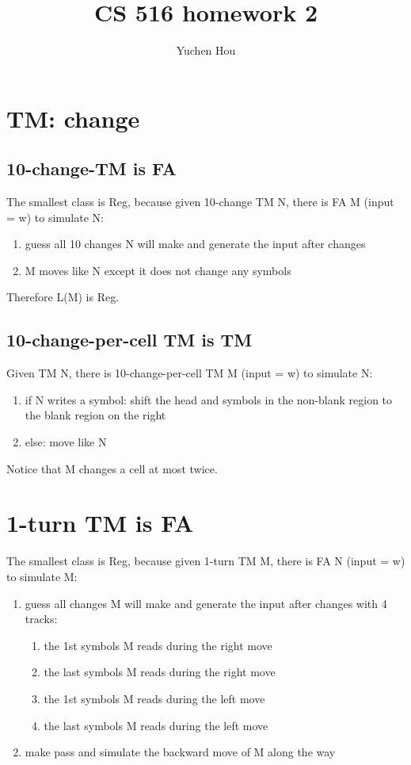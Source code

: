 \documentclass{article}
\begin{document}
\lstset{language=python, tabsize=4}
\title{CS 516 homework 2}
\author{Yuchen Hou}
\maketitle

\section{TM: change}

\subsection{10-change-TM is FA}
The smallest class is Reg, because given 10-change TM N, there is FA M (input = 
w) to simulate N:
\begin{enumerate}
	\item guess all 10 changes N will make and generate the input after changes
	\item M moves like N except it does not change any symbols
\end{enumerate}
Therefore L(M) is Reg.

\subsection{10-change-per-cell TM is TM}
Given TM N, there is 10-change-per-cell TM M (input = w) to simulate N:
\begin{enumerate}
	\item if N writes a symbol: shift the head and symbols in the non-blank 
	region to the blank region on the right
	\item else: move like N
\end{enumerate}
Notice that M changes a cell at most twice.

\section{1-turn TM is FA}
The smallest class is Reg, because given 1-turn TM M, there is FA N (input = w) 
to simulate M:
\begin{enumerate}
	\item guess all changes M will make and generate the input after changes 
	with 4 tracks:
	\begin{enumerate}		
		\item the 1st symbols M reads during the right move
		\item the last symbols M reads during the right move
		\item the 1st symbols M reads during the left move
		\item the last symbols M reads during the left move
	\end{enumerate}
	\item make pass and simulate the backward move of M along the way
\end{enumerate}
\end{document}
